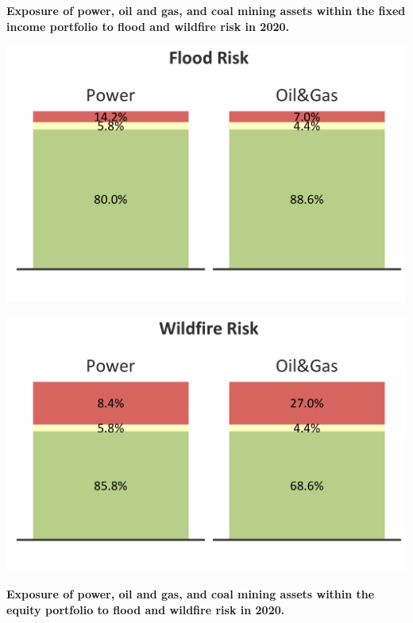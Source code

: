 \documentclass[10pt,table,a4]{article}\usepackage[]{graphicx}\usepackage[]{color}
\begin{document}
	
	\textbf{Exposure of power, oil and gas, and coal mining assets within the fixed income portfolio to flood and wildfire risk in 2020.}
	
	\vspace{-0.2cm}
	
	\begin{multicols}{2}
		
		\includegraphics[width = .85\linewidth]{CAFigures/Fig72}
		
		
		\includegraphics[width = .85\linewidth]{CAFigures/Fig74}
	\end{multicols}
	
	\vspace{-0.5cm}
	
	\textbf{Exposure of power, oil and gas, and coal mining assets within the equity portfolio to flood and wildfire risk in 2020.}
\end{document}

